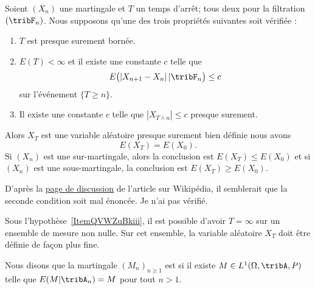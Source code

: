\begin{theorem} \label{ThoZTrdjtZ}
	Soient \( (X_n)\) une martingale et \( T\) un temps d'arrêt; tous deux pour la filtration \( (\tribF_n)\). Nous supposons qu'une des trois propriétés suivantes soit vérifiée :
	\begin{enumerate}
		\item
		      \( T\) est presque surement bornée.
		\item
		      \( E(T)<\infty\) et il existe une constante \( c\) telle que
		      \begin{equation}
			      E\big( | X_{n+1}-X_n |\,|\tribF_n \big)\leq c
		      \end{equation}
		      sur l'événement \( \{ T\geq n \}\).
		\item   \label{ItemQVWZuBkiii}
		      Il existe une constante \( c\) telle que \( | X_{T\wedge n} |\leq c\) presque surement.


	\end{enumerate}
	Alors \( X_T\) est une variable aléatoire presque surement bien définie nous avons
	\begin{equation}
		E(X_T)=E(X_0).
	\end{equation}
	Si \( (X_n)\) est une sur-martingale, alors la conclusion est \( E(X_T)\leq E(X_0)\) et si \( (X_n)\) est une sous-martingale, la conclusion est \( E(X_T)\geq E(X_0)\).
\end{theorem}

\begin{probleme}
	D'après la \href{https://en.wikipedia.org/wiki/Talk:Optional_stopping_theorem}{page de discussion} de l'article sur Wikipédia, il semblerait que la seconde condition soit mal énoncée. Je n'ai pas vérifié.
\end{probleme}

\begin{remark}
	Sous l'hypothèse~\ref{ItemQVWZuBkiii}, il est possible d'avoir \( T=\infty\) sur un ensemble de mesure non nulle. Sur cet ensemble, la variable aléatoire \( X_T\) doit être définie de façon plus fine.
\end{remark}

\begin{definition}
	Nous disons que la martingale \( (M_n)_{n\geq 1}\) est  si il existe \( M\in L^1(\Omega,\tribA,P)\) telle que \( E(M|\tribA_n)=M\) pour tout \( n>1\).
\end{definition}

